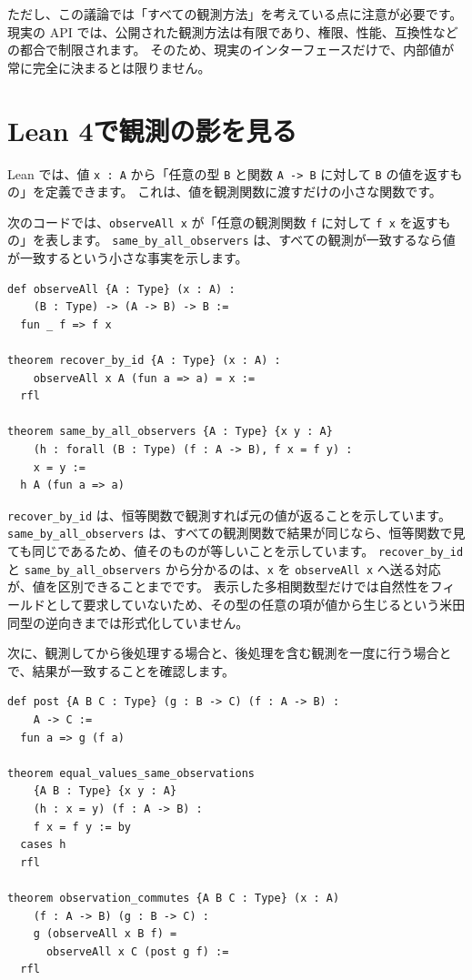 ただし、この議論では「すべての観測方法」を考えている点に注意が必要です。
現実の API では、公開された観測方法は有限であり、権限、性能、互換性などの都合で制限されます。
そのため、現実のインターフェースだけで、内部値が常に完全に決まるとは限りません。

\section{Lean 4で観測の影を見る}

Lean では、値 \texttt{x : A} から「任意の型 \texttt{B} と関数 \texttt{A -> B} に対して \texttt{B} の値を返すもの」を定義できます。
これは、値を観測関数に渡すだけの小さな関数です。

次のコードでは、\texttt{observeAll x} が「任意の観測関数 \texttt{f} に対して \texttt{f x} を返すもの」を表します。
\texttt{same\_by\_all\_observers} は、すべての観測が一致するなら値が一致するという小さな事実を示します。

\begin{listing}[htbp]
\begin{verbatim}
def observeAll {A : Type} (x : A) :
    (B : Type) -> (A -> B) -> B :=
  fun _ f => f x

theorem recover_by_id {A : Type} (x : A) :
    observeAll x A (fun a => a) = x :=
  rfl

theorem same_by_all_observers {A : Type} {x y : A}
    (h : forall (B : Type) (f : A -> B), f x = f y) :
    x = y :=
  h A (fun a => a)
\end{verbatim}
\caption{\texttt{recover\_by\_id}・\texttt{same\_by\_all\_observers}}
\label{lst:ch38_all_observers}
\end{listing}

\texttt{recover\_by\_id} は、恒等関数で観測すれば元の値が返ることを示しています。
\texttt{same\_by\_all\_observers} は、すべての観測関数で結果が同じなら、恒等関数で見ても同じであるため、値そのものが等しいことを示しています。
\texttt{recover\_by\_id} と \texttt{same\_by\_all\_observers} から分かるのは、\texttt{x} を \texttt{observeAll x} へ送る対応が、値を区別できることまでです。
表示した多相関数型だけでは自然性をフィールドとして要求していないため、その型の任意の項が値から生じるという米田同型の逆向きまでは形式化していません。

次に、観測してから後処理する場合と、後処理を含む観測を一度に行う場合とで、結果が一致することを確認します。

\begin{listing}[htbp]
\begin{verbatim}
def post {A B C : Type} (g : B -> C) (f : A -> B) :
    A -> C :=
  fun a => g (f a)

theorem equal_values_same_observations
    {A B : Type} {x y : A}
    (h : x = y) (f : A -> B) :
    f x = f y := by
  cases h
  rfl

theorem observation_commutes {A B C : Type} (x : A)
    (f : A -> B) (g : B -> C) :
    g (observeAll x B f) =
      observeAll x C (post g f) :=
  rfl
\end{verbatim}
\caption{\texttt{observation\_commutes}}
\label{lst:ch38_observation_commutes}
\end{listing}

